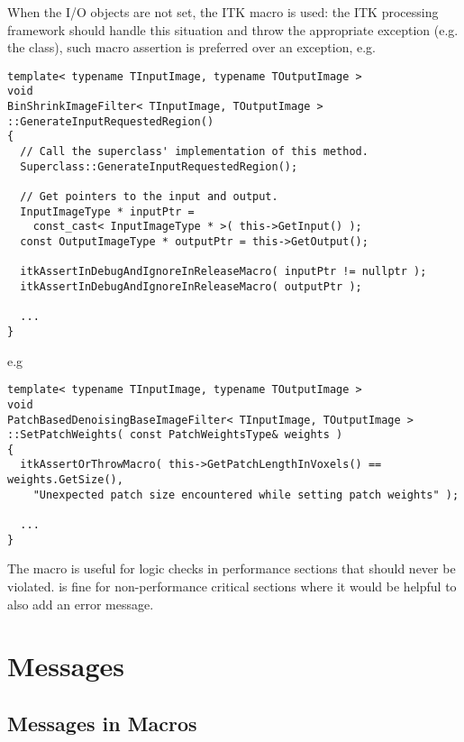 When the I/O objects are not set, the ITK
 macro is used: the ITK processing
framework should handle this situation and throw the appropriate exception (e.g.
the  class), such macro assertion is preferred over
an exception, e.g.

\small
\begin{verbatim}
template< typename TInputImage, typename TOutputImage >
void
BinShrinkImageFilter< TInputImage, TOutputImage >
::GenerateInputRequestedRegion()
{
  // Call the superclass' implementation of this method.
  Superclass::GenerateInputRequestedRegion();

  // Get pointers to the input and output.
  InputImageType * inputPtr =
    const_cast< InputImageType * >( this->GetInput() );
  const OutputImageType * outputPtr = this->GetOutput();

  itkAssertInDebugAndIgnoreInReleaseMacro( inputPtr != nullptr );
  itkAssertInDebugAndIgnoreInReleaseMacro( outputPtr );

  ...
}
\end{verbatim}
\normalsize

e.g

\small
\begin{verbatim}
template< typename TInputImage, typename TOutputImage >
void
PatchBasedDenoisingBaseImageFilter< TInputImage, TOutputImage >
::SetPatchWeights( const PatchWeightsType& weights )
{
  itkAssertOrThrowMacro( this->GetPatchLengthInVoxels() == weights.GetSize(),
    "Unexpected patch size encountered while setting patch weights" );

  ...
}
\end{verbatim}
\normalsize

The  macro is useful for logic
checks in performance sections that should never be violated.
 is fine for non-performance critical sections where
it would be helpful to also add an error message.


\section{Messages}
\label{sec:Messages}


\subsection{Messages in Macros}
\label{sec:MessagesInMacros}


